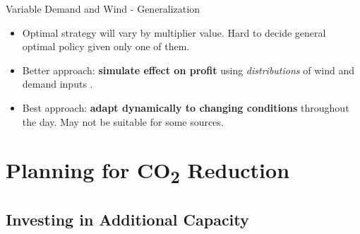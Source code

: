 \documentclass{beamer}
\begin{document}
	
    \begin{frame}{Variable Demand and Wind - Generalization}
    	
        	\begin{itemize}

                \item Optimal strategy will vary by multiplier value.  Hard to decide general optimal policy given only one of them.

                \item  Better approach: \textbf{simulate effect on profit} using \textit{distributions} of wind and demand inputs .

                \item Best approach: \textbf{adapt dynamically to changing conditions} throughout the day.  May not be suitable for some sources.  

			\end{itemize}   
    
    \end{frame}

    
    
    \section{Planning for CO\texorpdfstring{\textsubscript{2}}{2} Reduction}
    
    \subsection{Investing in Additional Capacity}
    
    
\end{document}
